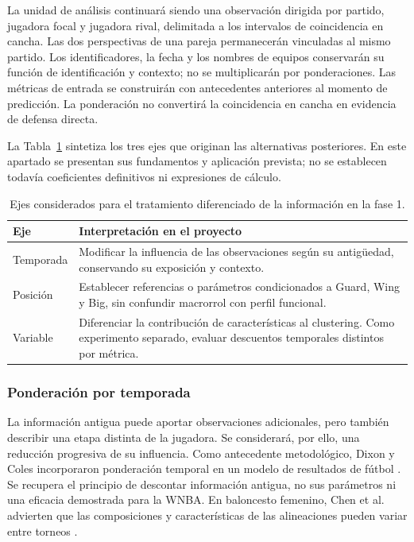 La unidad de análisis continuará siendo una observación dirigida por partido, jugadora focal y jugadora rival, delimitada a los intervalos de coincidencia en cancha. Las dos perspectivas de una pareja permanecerán vinculadas al mismo partido. Los identificadores, la fecha y los nombres de equipos conservarán su función de identificación y contexto; no se multiplicarán por ponderaciones. Las métricas de entrada se construirán con antecedentes anteriores al momento de predicción. La ponderación no convertirá la coincidencia en cancha en evidencia de defensa directa.

La Tabla~\ref{tab:tipos-ponderacion-fase1} sintetiza los tres ejes que originan las alternativas posteriores. En este apartado se presentan sus fundamentos y aplicación prevista; no se establecen todavía coeficientes definitivos ni expresiones de cálculo.

\begin{table}[htbp]
\centering
\small
\caption{Ejes considerados para el tratamiento diferenciado de la información en la fase 1.}
\label{tab:tipos-ponderacion-fase1}
\begin{tabularx}{\textwidth}{@{}p{2.35cm}X@{}}
\toprule
\textbf{Eje} & \textbf{Interpretación en el proyecto}\\
\midrule
Temporada & Modificar la influencia de las observaciones según su antigüedad, conservando su exposición y contexto.\\
Posición & Establecer referencias o parámetros condicionados a Guard, Wing y Big, sin confundir macrorrol con perfil funcional.\\
Variable & Diferenciar la contribución de características al clustering. Como experimento separado, evaluar descuentos temporales distintos por métrica.\\
\bottomrule
\end{tabularx}
\end{table}

\edef\profundidadAntesPonderacion{\number\value{secnumdepth}}
\setcounter{secnumdepth}{3}

\subsubsection{Ponderación por temporada}
\label{subsubsec:ponderacion-temporada}
La información antigua puede aportar observaciones adicionales, pero también describir una etapa distinta de la jugadora. Se considerará, por ello, una reducción progresiva de su influencia. Como antecedente metodológico, Dixon y Coles incorporaron ponderación temporal en un modelo de resultados de fútbol \cite{dixon1997scores}. Se recupera el principio de descontar información antigua, no sus parámetros ni una eficacia demostrada para la WNBA. En baloncesto femenino, Chen et al. advierten que las composiciones y características de las alineaciones pueden variar entre torneos \cite{Chen17122023}.

